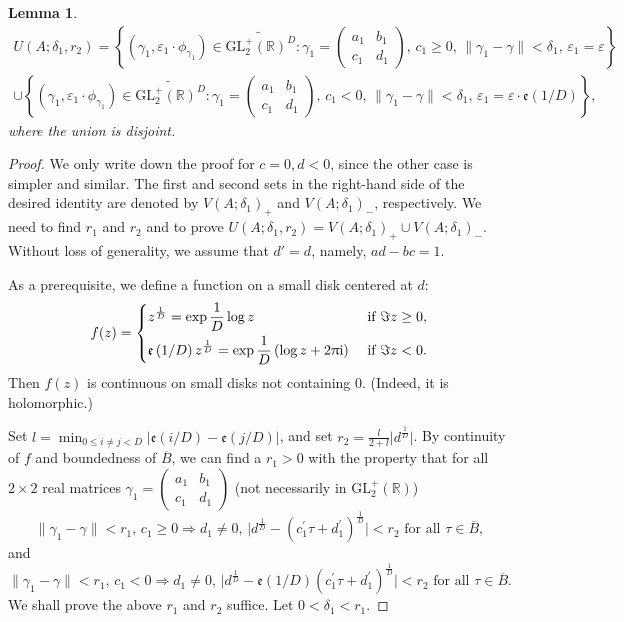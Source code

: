\documentclass[12pt]{amsart}
\numberwithin{equation}{section}
\theoremstyle{plain}
\newtheorem{lemm}[thm]{Lemma}
\theoremstyle{definition}
\theoremstyle{remark}
\newcommand\rmi{\mathrm{i}}
\newcommand\tbtmat[4]{\left(\begin{smallmatrix}{#1} & {#2} \\ {#3} & {#4}\end{smallmatrix}\right)}
\newcommand*\abs[1]{\lvert#1\rvert}
\newcommand\etp[1]{\mathfrak{e}\left(#1\right)}
\newcommand\glpR{\mathrm{GL}_2^{+}(\mathbb{R})}
\newcommand\Dcover[2]{\widetilde{#1^{#2}}}
\begin{document}
\begin{appendix}
\begin{lemm}
\begin{multline}
\label{eq:smallneighborhood2}
U(A;\delta_1,r_2)=\left\{(\gamma_1,\varepsilon_1\cdot\phi_{\gamma_1})\in\Dcover{\glpR}{D}\colon\gamma_1=\tbtmat{a_1}{b_1}{c_1}{d_1},\,c_1\geq0,\,\lVert\gamma_1-\gamma\rVert<\delta_1,\,\varepsilon_1=\varepsilon\right\}\\
\cup\left\{(\gamma_1,\varepsilon_1\cdot\phi_{\gamma_1})\in\Dcover{\glpR}{D}\colon\gamma_1=\tbtmat{a_1}{b_1}{c_1}{d_1},\,c_1<0,\,\lVert\gamma_1-\gamma\rVert<\delta_1,\,\varepsilon_1=\varepsilon\cdot\etp{1/D}\right\},
\end{multline}
where the union is disjoint.
\end{lemm}
\begin{proof}
We only write down the proof for $c=0,d<0$, since the other case is simpler and similar. The first and second sets in the right-hand side of the desired identity are denoted by $V(A;\delta_1)_{+}$ and $V(A;\delta_1)_{-}$, respectively. We need to find $r_1$ and $r_2$ and to prove $U(A;\delta_1,r_2)=V(A;\delta_1)_{+}\cup V(A;\delta_1)_{-}$. Without loss of generality, we assume that $d'=d$, namely, $ad-bc=1$.

As a prerequisite, we define a function on a small disk centered at $d$:
\begin{equation*}
f(z)=\begin{dcases}
z^{\frac{1}{D}}=\exp\frac{1}{D}\log z &\text{ if }\Im z\geq0,\\
\etp{1/D}z^{\frac{1}{D}}=\exp\frac{1}{D}\left(\log z+2\uppi\rmi\right) &\text{ if }\Im z<0.
\end{dcases}
\end{equation*}
Then $f(z)$ is continuous on small disks not containing $0$. (Indeed, it is holomorphic.)

Set $l=\min_{0\leq i\neq j<D}\abs{\etp{i/D}-\etp{j/D}}$, and set $r_2=\frac{l}{2+l}\abs{d^{\frac{1}{D}}}$. By continuity of $f$ and boundedness of $\overline{B}$, we can find a $r_1>0$ with the property that for all $2\times2$ real matrices $\gamma_1=\tbtmat{a_1}{b_1}{c_1}{d_1}$ (not necessarily in $\glpR$)
\begin{equation}
\label{eq:r1withproperty}
\lVert\gamma_1-\gamma\rVert<r_1,\,c_1\geq0\Longrightarrow d_1\neq0,\,\abs{d^{\frac{1}{D}}-(c_1^\prime\tau+d_1^\prime)^{\frac{1}{D}}}<r_2\text{ for all }\tau\in\overline{B},
\end{equation}
and
\begin{equation}
\label{eq:r1withpropertyminus}
\lVert\gamma_1-\gamma\rVert<r_1,\,c_1<0\Longrightarrow d_1\neq0,\,\abs{d^{\frac{1}{D}}-\etp{1/D}(c_1^\prime\tau+d_1^\prime)^{\frac{1}{D}}}<r_2\text{ for all }\tau\in\overline{B}.
\end{equation}
We shall prove the above $r_1$ and $r_2$ suffice. Let $0<\delta_1<r_1$.


\end{proof}
\end{appendix}
\end{document}
